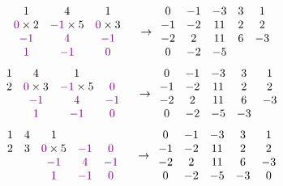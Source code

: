 \documentclass[11pt]{article}
\begin{document}
\[
\begin{array}{cccccccccc}
    &&1&4&1&\\
    &&\textcolor{violet}{0}\times 2&\textcolor{violet}{-1}\times 5& \textcolor{violet}{0}\times 3\\
    &&\textcolor{violet}{-1}&\textcolor{violet}{4}&\textcolor{violet}{-1}\\
    &&\textcolor{violet}{1}&\textcolor{violet}{-1}&\textcolor{violet}{0}& \\ 
\end{array}
\rightarrow
\begin{array}{ccccc}
    0 & -1 & -3 & 3&1\\
    -1 & -2 & 11 & 2&2\\
    -2 & 2 & 11 & 6& -3 \\
    0 & -2 & -5 & &  \\
\end{array}
\]
\[
\begin{array}{cccccccccc}
    &&1&4&1&\\
    &&2&\textcolor{violet}{0}\times 3&\textcolor{violet}{-1}\times 5& \textcolor{violet}{0}&\\
    &&&\textcolor{violet}{-1}&\textcolor{violet}{4}&\textcolor{violet}{-1}\\
    &&&\textcolor{violet}{1}&\textcolor{violet}{-1}&\textcolor{violet}{0}& \\ 
\end{array}
\rightarrow
\begin{array}{ccccc}
    0 & -1 & -3 & 3&1\\
    -1 & -2 & 11 & 2&2\\
    -2 & 2 & 11 & 6& -3 \\
    0 & -2 & -5 & -3&  \\
\end{array}
\]
\[
\begin{array}{cccccccccc}
    &&1&4&1&\\
    &&2&3&\textcolor{violet}{0}\times 5&\textcolor{violet}{-1}&\textcolor{violet}{0}&\\
    &&&&\textcolor{violet}{-1}&\textcolor{violet}{4}&\textcolor{violet}{-1}\\
    &&&&\textcolor{violet}{1}&\textcolor{violet}{-1}&\textcolor{violet}{0}& \\ 
\end{array}
\rightarrow
\begin{array}{ccccc}
    0 & -1 & -3 & 3&1\\
    -1 & -2 & 11 & 2&2\\
    -2 & 2 & 11 & 6& -3 \\
    0 & -2 & -5 & -3& 0 \\
\end{array}
\]
\end{document}
